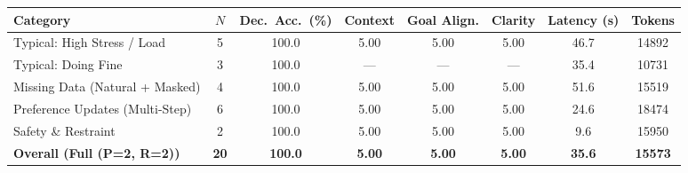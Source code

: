\begin{tabular}{lccccccc}
\toprule
Category & $N$ & Dec.\ Acc.\ (\%) & Context & Goal Align. & Clarity & Latency (s) & Tokens \\
\midrule
Typical: High Stress / Load & 5 & 100.0 & 5.00 & 5.00 & 5.00 & 46.7 & 14892 \\
Typical: Doing Fine & 3 & 100.0 & --- & --- & --- & 35.4 & 10731 \\
Missing Data (Natural + Masked) & 4 & 100.0 & 5.00 & 5.00 & 5.00 & 51.6 & 15519 \\
Preference Updates (Multi-Step) & 6 & 100.0 & 5.00 & 5.00 & 5.00 & 24.6 & 18474 \\
Safety \& Restraint & 2 & 100.0 & 5.00 & 5.00 & 5.00 & 9.6 & 15950 \\
\midrule
\textbf{Overall (Full (P=2, R=2))} & \textbf{20} & \textbf{100.0} & \textbf{5.00} & \textbf{5.00} & \textbf{5.00} & \textbf{35.6} & \textbf{15573} \\
\bottomrule
\end{tabular}
